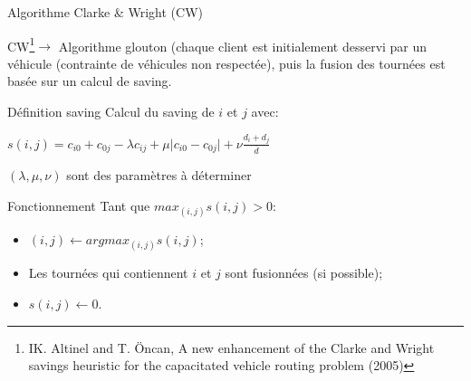 \documentclass{beamer}
\begin{document}
\begin{frame}{Algorithme Clarke \& Wright (CW)}

CW\footnote{IK. Altinel and T. Öncan, A new enhancement of the Clarke and Wright savings heuristic for the capacitated vehicle routing problem (2005)}$\rightarrow$ Algorithme glouton (chaque client est initialement desservi par un véhicule (contrainte de véhicules non respectée), puis la fusion des tournées est basée sur un calcul de saving. 



\begin{exampleblock}{Définition saving}
Calcul du saving de $i$ et $j$ avec:

\centering
$s(i,j) = c_{i0} + c_{0j} - \lambda c_{ij} + \mu \vert c_{i0} - c_{0j} \vert + \nu \frac{d_i + d_j}{\overline{d}}$

$(\lambda,\mu,\nu)$ sont des paramètres à déterminer
\end{exampleblock}

\begin{block}{Fonctionnement}
Tant que $max_{(i,j)}s(i,j) > 0$:
\begin{itemize}
\item $(i,j) \leftarrow argmax_{(i,j)}s(i,j)$;
\item Les tournées qui contiennent $i$ et $j$ sont fusionnées (si possible);
\item $s(i,j) \leftarrow  0$.
\end{itemize} 

\end{block}
\end{frame}
\end{document}
